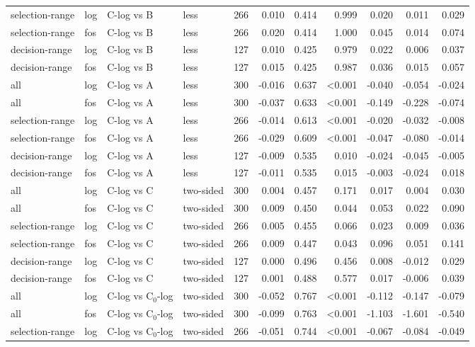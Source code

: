 \begin{longtable}{llllrrrrrrr}
selection-range & log & C-log vs B & less & 266 & 0.010 & 0.414 & 0.999 & 0.020 & 0.011 & 0.029 \\
selection-range & fos & C-log vs B & less & 266 & 0.020 & 0.414 & 1.000 & 0.045 & 0.014 & 0.074 \\
decision-range & log & C-log vs B & less & 127 & 0.010 & 0.425 & 0.979 & 0.022 & 0.006 & 0.037 \\
decision-range & fos & C-log vs B & less & 127 & 0.015 & 0.425 & 0.987 & 0.036 & 0.015 & 0.057 \\
all & log & C-log vs A & less & 300 & -0.016 & 0.637 & <0.001 & -0.040 & -0.054 & -0.024 \\
all & fos & C-log vs A & less & 300 & -0.037 & 0.633 & <0.001 & -0.149 & -0.228 & -0.074 \\
selection-range & log & C-log vs A & less & 266 & -0.014 & 0.613 & <0.001 & -0.020 & -0.032 & -0.008 \\
selection-range & fos & C-log vs A & less & 266 & -0.029 & 0.609 & <0.001 & -0.047 & -0.080 & -0.014 \\
decision-range & log & C-log vs A & less & 127 & -0.009 & 0.535 & 0.010 & -0.024 & -0.045 & -0.005 \\
decision-range & fos & C-log vs A & less & 127 & -0.011 & 0.535 & 0.015 & -0.003 & -0.024 & 0.018 \\
all & log & C-log vs C & two-sided & 300 & 0.004 & 0.457 & 0.171 & 0.017 & 0.004 & 0.030 \\
all & fos & C-log vs C & two-sided & 300 & 0.009 & 0.450 & 0.044 & 0.053 & 0.022 & 0.090 \\
selection-range & log & C-log vs C & two-sided & 266 & 0.005 & 0.455 & 0.066 & 0.023 & 0.009 & 0.036 \\
selection-range & fos & C-log vs C & two-sided & 266 & 0.009 & 0.447 & 0.043 & 0.096 & 0.051 & 0.141 \\
decision-range & log & C-log vs C & two-sided & 127 & 0.000 & 0.496 & 0.456 & 0.008 & -0.012 & 0.029 \\
decision-range & fos & C-log vs C & two-sided & 127 & 0.001 & 0.488 & 0.577 & 0.017 & -0.006 & 0.039 \\
all & log & C-log vs C$_0$-log & two-sided & 300 & -0.052 & 0.767 & <0.001 & -0.112 & -0.147 & -0.079 \\
all & fos & C-log vs C$_0$-log & two-sided & 300 & -0.099 & 0.763 & <0.001 & -1.103 & -1.601 & -0.540 \\
selection-range & log & C-log vs C$_0$-log & two-sided & 266 & -0.051 & 0.744 & <0.001 & -0.067 & -0.084 & -0.049 \\

\end{longtable}
